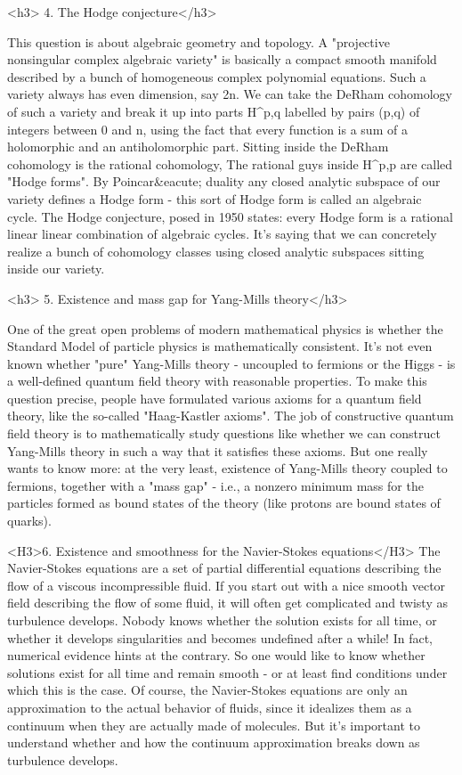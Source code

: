 <h3> 4. The Hodge conjecture</h3>

This question is about algebraic geometry and topology. A 
"projective nonsingular complex algebraic variety" 
is basically a compact smooth manifold described
by a bunch of homogeneous complex polynomial equations. Such a variety
always has even dimension, say 2n. We can take the DeRham cohomology of
such a variety and break it up into parts H^{p,q} 
labelled by pairs (p,q)
of integers between 0 and n, using the fact that every function is a sum
of a holomorphic and an antiholomorphic part. Sitting inside the DeRham
cohomology is the rational cohomology, The rational guys inside 
H^{p,p} are called "Hodge forms". 
By Poincar&eacute; duality any closed analytic subspace
of our variety defines a Hodge form - this sort of Hodge form is called
an algebraic cycle. The Hodge conjecture, posed in 1950 states: every Hodge
form is a rational linear linear combination of algebraic cycles. It's
saying that we can concretely realize a bunch of cohomology classes using
closed analytic subspaces sitting inside our variety.

<h3> 5. Existence and mass gap for Yang-Mills theory</h3>

One of the great open problems of modern mathematical physics is whether
the Standard Model of particle physics is mathematically consistent. It's
not even known whether "pure" Yang-Mills theory - uncoupled to 
fermions or the Higgs - is a well-defined quantum field theory with reasonable 
properties.  To make this question precise, people have formulated various 
axioms for a quantum field theory, like the so-called "Haag-Kastler 
axioms". The job
of constructive quantum field theory is to mathematically study questions
like whether we can construct Yang-Mills theory in such a way that it satisfies
these axioms. But one really wants to know more: at the very least, existence
of Yang-Mills theory coupled to fermions, together with a "mass 
gap" -
i.e., a nonzero minimum mass for the particles formed as bound states of
the theory (like protons are bound states of quarks).

<H3>6. Existence and smoothness for the Navier-Stokes equations</H3>
The Navier-Stokes equations are a set of partial differential equations
describing the flow of a viscous incompressible fluid. If you start out
with a nice smooth vector field describing the flow of some fluid, it will
often get complicated and twisty as turbulence develops. Nobody knows whether
the solution exists for all time, or whether it develops singularities
and becomes undefined after a while! In fact, numerical evidence hints
at the contrary. So one would like to know whether solutions exist for
all time and remain smooth - or at least find conditions under which this
is the case. Of course, the Navier-Stokes equations are only an approximation
to the actual behavior of fluids, since it idealizes them as a continuum
when they are actually made of molecules. But it's important to understand
whether and how the continuum approximation breaks down as turbulence develops.

